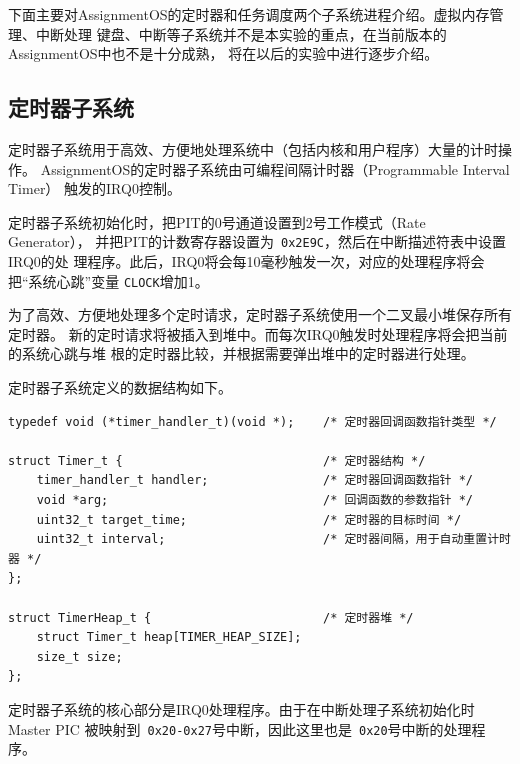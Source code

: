 \documentclass[a4paper, adobefonts]{ctexart}
\begin{document}
下面主要对AssignmentOS的定时器和任务调度两个子系统进程介绍。虚拟内存管理、中断处理
键盘、中断等子系统并不是本实验的重点，在当前版本的AssignmentOS中也不是十分成熟，
将在以后的实验中进行逐步介绍。

\subsection{定时器子系统}
定时器子系统用于高效、方便地处理系统中（包括内核和用户程序）大量的计时操作。
AssignmentOS的定时器子系统由可编程间隔计时器（Programmable Interval Timer）
触发的IRQ0控制。

定时器子系统初始化时，把PIT的0号通道设置到2号工作模式（Rate Generator），
并把PIT的计数寄存器设置为~\verb|0x2E9C|，然后在中断描述符表中设置IRQ0的处
理程序。此后，IRQ0将会每10毫秒触发一次，对应的处理程序将会把``系统心跳''变量
\verb|CLOCK|增加1。

为了高效、方便地处理多个定时请求，定时器子系统使用一个二叉最小堆保存所有定时器。
新的定时请求将被插入到堆中。而每次IRQ0触发时处理程序将会把当前的系统心跳与堆
根的定时器比较，并根据需要弹出堆中的定时器进行处理。

定时器子系统定义的数据结构如下。

\begin{verbatim}
typedef void (*timer_handler_t)(void *);    /* 定时器回调函数指针类型 */

struct Timer_t {                            /* 定时器结构 */
    timer_handler_t handler;                /* 定时器回调函数指针 */
    void *arg;                              /* 回调函数的参数指针 */
    uint32_t target_time;                   /* 定时器的目标时间 */
    uint32_t interval;                      /* 定时器间隔，用于自动重置计时器 */
};

struct TimerHeap_t {                        /* 定时器堆 */
    struct Timer_t heap[TIMER_HEAP_SIZE];
    size_t size;
};
\end{verbatim}

定时器子系统的核心部分是IRQ0处理程序。由于在中断处理子系统初始化时Master PIC
被映射到~\verb|0x20-0x27|号中断，因此这里也是~\verb|0x20|号中断的处理程序。
\end{document}
